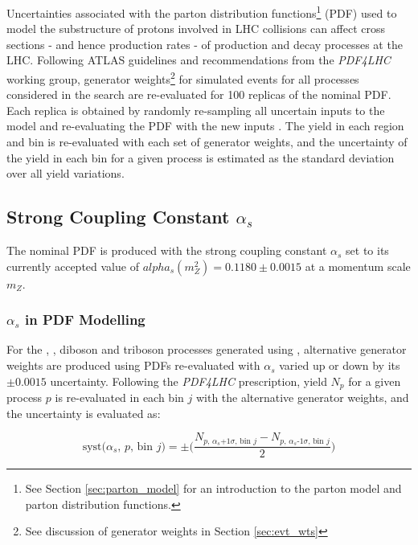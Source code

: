 Uncertainties associated with the parton distribution functions\footnote{See Section \ref{sec:parton_model} for an introduction to the parton model and parton distribution functions.} (PDF) used to model the substructure of protons involved in LHC collisions can affect cross sections - and hence production rates - of production and decay processes at the LHC. Following ATLAS guidelines and recommendations from the \textit{PDF4LHC} \cite{PDF4LHC_recos_2016} working group, generator weights\footnote{See discussion of generator weights in Section \ref{sec:evt_wts}} for simulated events for all processes considered in the search are re-evaluated for 100 replicas of the nominal PDF. Each replica is obtained by randomly re-sampling all uncertain inputs to the model and re-evaluating the PDF with the new inputs \cite{BALL20091}. The yield in each region and bin is re-evaluated with each set of generator weights, and the uncertainty of the yield in each bin for a given process is estimated as the standard deviation over all yield variations.

\subsection{Strong Coupling Constant \(\alpha_s\)}

The nominal PDF is produced with the strong coupling constant \(\alpha_s\) set to its currently accepted value of \(alpha_s(m_Z^2)=0.1180\pm0.0015\) \cite{PDF4LHC_recos_2016} at a momentum scale \(m_Z\). 

\subsubsection{\(\alpha_s\) in PDF Modelling}

For the \wjets, \zjets, diboson and triboson processes generated using , alternative generator weights are produced using PDFs re-evaluated with \(\alpha_s\) varied up or down by its \(\pm0.0015\) uncertainty. Following the \textit{PDF4LHC} prescription, yield \(N_p\) for a given process \(p\) is re-evaluated in each bin \(j\) with the alternative generator weights, and the uncertainty is evaluated as:

\begin{equation}
\label{eq:alphas_syst}
\text{syst}\text{(\(\alpha_s\), \(p\), bin \(j\))}= \pm\Bigg(\frac{N_\text{\(p\), \(\alpha_s\)+1\(\sigma\), bin \(j\)} - N_\text{\(p\), \(\alpha_s\)-1\(\sigma\), bin \(j\)} }{2}\Bigg)
\end{equation}

